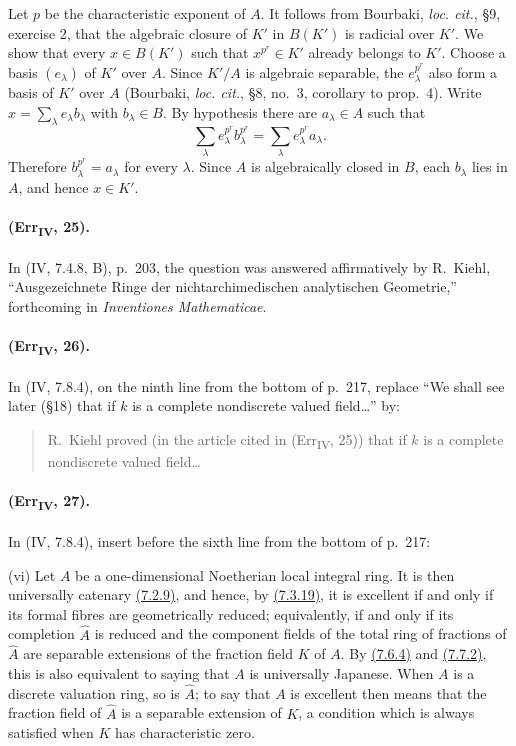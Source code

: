 Let $p$ be the characteristic exponent of $A$.  It follows from
Bourbaki, \emph{loc. cit.}, \S9, exercise 2, that the algebraic closure
of $K'$ in $B(K')$ is radicial over $K'$.  We show that every
$x\in B(K')$ such that $x^{p^r}\in K'$ already belongs to $K'$.
Choose a basis $(e_\lambda)$ of $K'$ over $A$.  Since $K'/A$ is
algebraic separable, the $e_\lambda^{p^r}$ also form a basis of $K'$ over
$A$ (Bourbaki, \emph{loc. cit.}, \S8, no.~3, corollary to prop.~4).
Write $x=\sum_\lambda e_\lambda b_\lambda$ with $b_\lambda\in B$.  By
hypothesis there are $a_\lambda\in A$ such that
\[
 \sum_\lambda e_\lambda^{p^r}b_\lambda^{p^r}
 =\sum_\lambda e_\lambda^{p^r}a_\lambda.
\]
Therefore $b_\lambda^{p^r}=a_\lambda$ for every $\lambda$.  Since $A$
is algebraically closed in $B$, each $b_\lambda$ lies in $A$, and hence
$x\in K'$.

\paragraph{(Err\textsubscript{IV}, 25).}
In (IV, 7.4.8, B), p.~203, the question was answered affirmatively by
R.~Kiehl, ``Ausgezeichnete Ringe der nichtarchimedischen analytischen
Geometrie,'' forthcoming in \emph{Inventiones Mathematicae}.

\paragraph{(Err\textsubscript{IV}, 26).}
In (IV, 7.8.4), on the ninth line from the bottom of p.~217, replace
``We shall see later (\S18) that if $k$ is a complete nondiscrete valued
field\ldots'' by:
\begin{quote}
R.~Kiehl proved (in the article cited in
(Err\textsubscript{IV}, 25)) that if $k$ is a complete nondiscrete
valued field\ldots
\end{quote}

\paragraph{(Err\textsubscript{IV}, 27).}
In (IV, 7.8.4), insert before the sixth line from the bottom of p.~217:

\smallskip
\noindent
\textup{(vi)} Let $A$ be a one-dimensional Noetherian local integral
ring.  It is then universally catenary {\hyperref[IV.7.2.9]{(7.2.9)}}, and hence, by {\hyperref[IV.7.3.19]{(7.3.19)}},
it is excellent if and only if its formal fibres are geometrically
reduced; equivalently, if and only if its completion $\widehat A$ is
reduced and the component fields of the total ring of fractions of
$\widehat A$ are separable extensions of the fraction field $K$ of
$A$.  By {\hyperref[IV.7.6.4]{(7.6.4)}} and {\hyperref[IV.7.7.2]{(7.7.2)}}, this is also equivalent to saying that
$A$ is universally Japanese.  When $A$ is a discrete valuation ring,
so is $\widehat A$; to say that $A$ is excellent then means that the
fraction field of $\widehat A$ is a separable extension of $K$, a
condition which is always satisfied when $K$ has characteristic zero.

